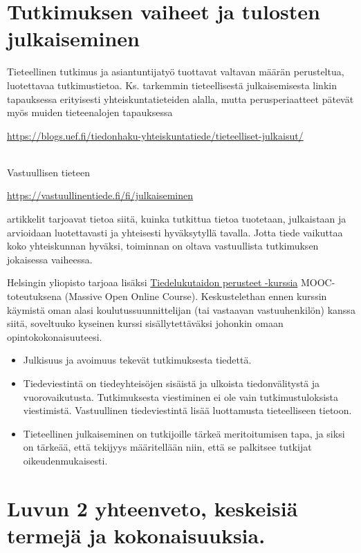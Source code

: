 \documentclass[
]{book}
\providecommand{\tightlist}{%
  \setlength{\itemsep}{0pt}\setlength{\parskip}{0pt}}
\begin{document}
\hypertarget{alaluku25}{%
\section{Tutkimuksen vaiheet ja tulosten julkaiseminen}\label{alaluku25}}

Tieteellinen tutkimus ja asiantuntijatyö tuottavat valtavan määrän perusteltua, luotettavaa tutkimustietoa. Ks. tarkemmin tieteellisestä julkaisemisesta linkin tapauksessa erityisesti yhteiskuntatieteiden alalla, mutta perusperiaatteet pätevät myös muiden tieteenalojen tapauksessa

\url{https://blogs.uef.fi/tiedonhaku-yhteiskuntatiede/tieteelliset-julkaisut/}\strut \\
\newpage
Vastuullisen tieteen

\url{https://vastuullinentiede.fi/fi/julkaiseminen}

artikkelit tarjoavat tietoa siitä, kuinka tutkittua tietoa tuotetaan, julkaistaan ja arvioidaan luotettavasti ja yhteisesti hyväksytyllä tavalla. Jotta tiede vaikuttaa koko yhteiskunnan hyväksi, toiminnan on oltava vastuullista tutkimuksen jokaisessa vaiheessa.

Helsingin yliopisto tarjoaa lisäksi \href{https://tiedelukutaito.mooc.fi/}{Tiedelukutaidon perusteet -kurssia} MOOC-toteutuksena (Massive Open Online Course). Keskustelethan ennen kurssin käymistä oman alasi koulutussuunnittelijan (tai vastaavan vastuuhenkilön) kanssa siitä, soveltuuko kyseinen kurssi sisällytettäväksi johonkin omaan opintokokonaisuuteesi.

\begin{itemize}
\tightlist
\item
  Julkisuus ja avoimuus tekevät tutkimuksesta tiedettä.
\item
  Tiedeviestintä on tiedeyhteisöjen sisäistä ja ulkoista tiedonvälitystä ja vuorovaikutusta. Tutkimuksesta viestiminen ei ole vain tutkimustuloksista viestimistä. Vastuullinen tiedeviestintä lisää luottamusta tieteelliseen tietoon.
\item
  Tieteellinen julkaiseminen on tutkijoille tärkeä meritoitumisen tapa, ja siksi on tärkeää, että tekijyys määritellään niin, että se palkitsee tutkijat oikeudenmukaisesti.
\end{itemize}

\hypertarget{luvun-2-yhteenveto-keskeisiuxe4-termejuxe4-ja-kokonaisuuksia.}{%
\section{Luvun 2 yhteenveto, keskeisiä termejä ja kokonaisuuksia.}\label{luvun-2-yhteenveto-keskeisiuxe4-termejuxe4-ja-kokonaisuuksia.}}
\end{document}
